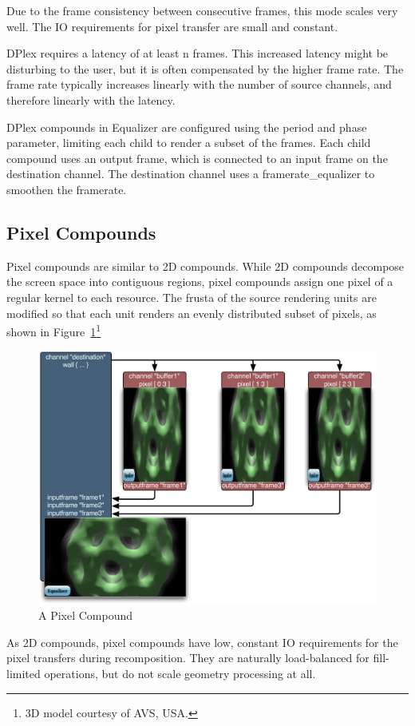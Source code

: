\documentclass[10pt,a4]{scrartcl}
\newcommand{\fig}[1]{Figure~\ref{#1}}
\begin{document}
Due to the frame consistency between consecutive frames, this mode scales
very well. The IO requirements for pixel transfer are small and
constant.

DPlex requires a latency of at least n frames. This increased latency
might be disturbing to the user, but it is often compensated by the
higher frame rate. The frame rate typically increases linearly with the
number of source channels, and therefore linearly with the latency.

DPlex compounds in Equalizer are configured using the \textsf{period}
and \textsf{phase} parameter, limiting each child to render a subset of
the frames. Each child compound uses an output frame, which is connected
to an input frame on the destination channel. The destination channel
uses a \textsf{framerate\_equalizer} to smoothen the framerate.


\subsection{Pixel Compounds}

Pixel compounds are similar to 2D compounds. While 2D compounds decompose the
screen space into contiguous regions, pixel compounds assign one pixel of a
regular kernel to each resource. The frusta of the source rendering units are
modified so that each unit renders an evenly distributed subset of pixels, as
shown in \fig{fPixel}\footnote{3D model courtesy of AVS, USA.}

\begin{figure}
  \includegraphics[width=.618\textwidth]{images/Pixel.pdf}
  {\caption{\label{fPixel}\small A Pixel Compound}}
\end{figure}
As 2D compounds, pixel compounds have low, constant IO requirements for the
pixel transfers during recomposition. They are naturally load-balanced for
fill-limited operations, but do not scale geometry processing at all.
\end{document}
